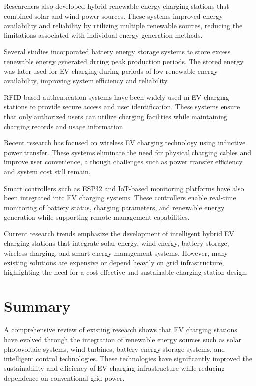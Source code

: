 \documentclass[12pt]{report}
\begin{document}
\begin{Certificatepage}
\begin{center}
\begin{justify}
\vspace{10pt}
Researchers also developed hybrid renewable energy charging stations that combined solar and wind power sources. These systems improved energy availability and reliability by utilizing multiple renewable sources, reducing the limitations associated with individual energy generation methods.

\vspace{10pt}
Several studies incorporated battery energy storage systems to store excess renewable energy generated during peak production periods. The stored energy was later used for EV charging during periods of low renewable energy availability, improving system efficiency and reliability.

\vspace{10pt}
RFID-based authentication systems have been widely used in EV charging stations to provide secure access and user identification. These systems ensure that only authorized users can utilize charging facilities while maintaining charging records and usage information.

\vspace{10pt}
Recent research has focused on wireless EV charging technology using inductive power transfer. These systems eliminate the need for physical charging cables and improve user convenience, although challenges such as power transfer efficiency and system cost still remain.

\vspace{10pt}
Smart controllers such as ESP32 and IoT-based monitoring platforms have also been integrated into EV charging systems. These controllers enable real-time monitoring of battery status, charging parameters, and renewable energy generation while supporting remote management capabilities.

\vspace{10pt}
Current research trends emphasize the development of intelligent hybrid EV charging stations that integrate solar energy, wind energy, battery storage, wireless charging, and smart energy management systems. However, many existing solutions are expensive or depend heavily on grid infrastructure, highlighting the need for a cost-effective and sustainable charging station design.

\vspace{70pt}

\section{Summary}
A comprehensive review of existing research shows that EV charging stations have evolved through the integration of renewable energy sources such as solar photovoltaic systems, wind turbines, battery energy storage systems, and intelligent control technologies. These technologies have significantly improved the sustainability and efficiency of EV charging infrastructure while reducing dependence on conventional grid power.


\end{justify}
\end{center}
\end{Certificatepage}
\end{document}
